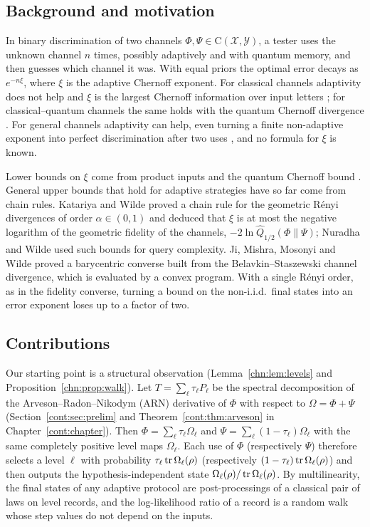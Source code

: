 \subsection{Background and motivation}
In binary discrimination of two channels $\Phi,\Psi\in\mathrm C(\mathcal X,\mathcal Y)$, a tester uses the unknown channel $n$ times, possibly adaptively and with quantum memory, and then guesses which channel it was. With equal priors the optimal error decays as $e^{-n\xi}$, where $\xi$ is the adaptive Chernoff exponent. For classical channels adaptivity does not help and $\xi$ is the largest Chernoff information over input letters \cite{Hayashi2009}; for classical--quantum channels the same holds with the quantum Chernoff divergence \cite{SalekHayashiWinter2022}. For general channels adaptivity can help, even turning a finite non-adaptive exponent into perfect discrimination after two uses \cite{HHLW2010,SalekHayashiWinter2022}, and no formula for $\xi$ is known.

Lower bounds on $\xi$ come from product inputs and the quantum Chernoff bound \cite{AudenaertChernoff2007,NussbaumSzkola2009}. General upper bounds that hold for adaptive strategies have so far come from chain rules. Katariya and Wilde \cite{KatariyaWilde2021} proved a chain rule for the geometric R\'enyi divergences of order $\alpha\in(0,1)$ and deduced that $\xi$ is at most the negative logarithm of the geometric fidelity of the channels, $-2\ln\widehat Q_{1/2}(\Phi\|\Psi)$; Nuradha and Wilde \cite{NuradhaWilde2025} used such bounds for query complexity. Ji, Mishra, Mosonyi and Wilde \cite{JMMW2024,JMMW2025} proved a barycentric converse built from the Belavkin--Staszewski channel divergence, which is evaluated by a convex program. With a single R\'enyi order, as in the fidelity converse, turning a bound on the non-i.i.d.\ final states into an error exponent loses up to a factor of two.

\subsection{Contributions}
Our starting point is a structural observation (Lemma~\ref{chn:lem:levels} and Proposition~\ref{chn:prop:walk}). Let $T=\sum_\ell\tau_\ell P_\ell$ be the spectral decomposition of the Arveson--Radon--Nikodym (ARN) derivative of $\Phi$ with respect to $\Omega=\Phi+\Psi$ \cite{arveson1969subalgebras,Raginsky2003} (Section~\ref{cont:sec:prelim} and Theorem~\ref{cont:thm:arveson} in Chapter~\ref{cont:chapter}). Then $\Phi=\sum_\ell\tau_\ell\Omega_\ell$ and $\Psi=\sum_\ell(1-\tau_\ell)\Omega_\ell$ with the same completely positive level maps $\Omega_\ell$. Each use of $\Phi$ (respectively $\Psi$) therefore selects a level $\ell$ with probability $\tau_\ell\operatorname{tr}\Omega_\ell(\rho)$ (respectively $(1-\tau_\ell)\operatorname{tr}\Omega_\ell(\rho)$) and then outputs the hypothesis-independent state $\Omega_\ell(\rho)/\operatorname{tr}\Omega_\ell(\rho)$. By multilinearity, the final states of any adaptive protocol are post-processings of a classical pair of laws on level records, and the log-likelihood ratio of a record is a random walk whose step values do not depend on the inputs.


